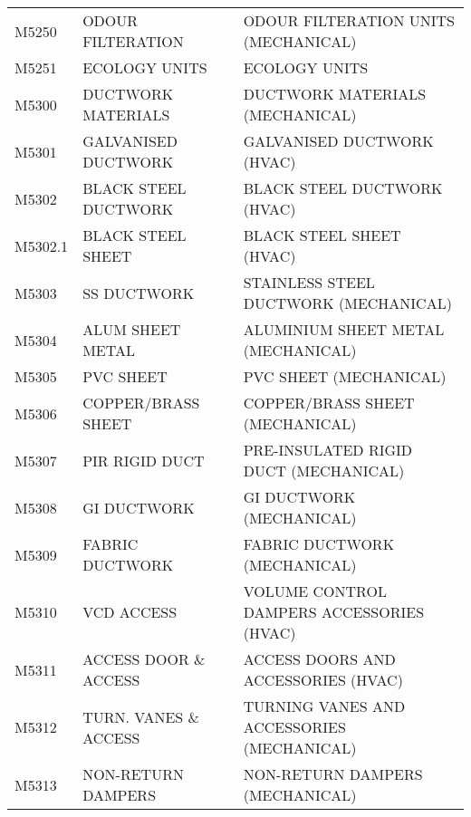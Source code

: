 \begin{longtable}[l]{l%
                  l|%
                  l|}
\rowcolor{thetableheadbgcolor!0.25!white} M5250       & ODOUR FILTERATION   & ODOUR FILTERATION UNITS (MECHANICAL)   \\
\rowcolor{thetableheadbgcolor!0.25!white} M5251       & ECOLOGY UNITS   & ECOLOGY UNITS   \\
\rowcolor{thetableheadbgcolor!0.25!white} M5300       & DUCTWORK MATERIALS   & DUCTWORK MATERIALS (MECHANICAL)   \\
\rowcolor{thetableheadbgcolor!0.25!white} M5301       & GALVANISED DUCTWORK   & GALVANISED DUCTWORK (HVAC)   \\
\rowcolor{thetableheadbgcolor!0.25!white} M5302       & BLACK STEEL DUCTWORK   & BLACK STEEL DUCTWORK (HVAC)   \\
\rowcolor{thetableheadbgcolor!0.25!white} M5302.1     & BLACK STEEL SHEET   & BLACK STEEL SHEET (HVAC)   \\
\rowcolor{thetableheadbgcolor!0.25!white} M5303       & SS DUCTWORK   & STAINLESS STEEL DUCTWORK (MECHANICAL)   \\
\rowcolor{thetableheadbgcolor!0.25!white} M5304       & ALUM SHEET METAL   & ALUMINIUM SHEET METAL (MECHANICAL)   \\
\rowcolor{thetableheadbgcolor!0.25!white} M5305       & PVC SHEET   & PVC SHEET (MECHANICAL)   \\
\rowcolor{thetableheadbgcolor!0.25!white} M5306       & COPPER/BRASS SHEET   & COPPER/BRASS SHEET (MECHANICAL)   \\
\rowcolor{thetableheadbgcolor!0.25!white} M5307       & PIR RIGID DUCT   & PRE-INSULATED RIGID DUCT (MECHANICAL)   \\
\rowcolor{thetableheadbgcolor!0.25!white} M5308       & GI DUCTWORK   & GI DUCTWORK (MECHANICAL)   \\
\rowcolor{thetableheadbgcolor!0.25!white} M5309       & FABRIC DUCTWORK   & FABRIC DUCTWORK (MECHANICAL)   \\
\rowcolor{thetableheadbgcolor!0.25!white} M5310       & VCD ACCESS   & VOLUME CONTROL DAMPERS ACCESSORIES (HVAC)   \\
\rowcolor{thetableheadbgcolor!0.25!white} M5311       & ACCESS DOOR \& ACCESS   & ACCESS DOORS AND ACCESSORIES (HVAC)   \\
\rowcolor{thetableheadbgcolor!0.25!white} M5312       & TURN. VANES \& ACCESS   & TURNING VANES AND ACCESSORIES (MECHANICAL)   \\
\rowcolor{thetableheadbgcolor!0.25!white} M5313       & NON-RETURN DAMPERS   & NON-RETURN DAMPERS (MECHANICAL)   \\

\end{longtable}
